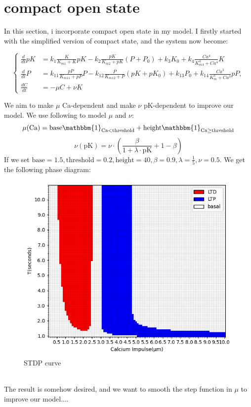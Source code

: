 \documentclass{article}
\begin{document}
\section{compact open state}
In this section, i incorporate compact open state in my model. I firstly started with the simplified version of compact state, and the system now become:

\begin{equation}
\left\{
    \begin{aligned}
        \frac{d}{dt}pK &= k_1 \frac{K}{K_{m1} + K}pK - k_2 \frac{pK}{K_{m2} + pK}(P + P_0) + k_3K_0 + k_4 \frac{Ca^4}{K_{m4}^4 + Ca^4} K\\
        \frac{d}{dt}P &= k_{11} \frac{pP}{K_{m11} + pP}P - k_{12} \frac{P}{K_{m12} + P}(pK + pK_0) + k_{13}P_0 + k_{14} \frac{Ca^3}{K_{m}^3 + Ca^3}pP,\\
        \frac{dC}{dt} &=-\mu C+\nu K
    \end{aligned}
\right.
\end{equation}

We aim to make $\mu$ Ca-dependent and make $\nu$ pK-dependent to improve our model. We use following to model $\mu$ and $\nu$:
\[
\mu(\text{Ca})=\text{base} \mathbbm{1}_{\text{Ca}<\text{threshold}}+\text{height}\mathbbm{1}_{\text{Ca}\geq\text{threshold}}
\]
\[
\nu(\text{{pK}}) = \nu \cdot\left( \frac{\beta}{1 + \lambda \cdot \text{{pK}}}  + 1 - \beta\right)
\]
If we set \(\text{base}=1.5, \text{threshold}=0.2, \text{height}=40, \beta=0.9, \lambda=\frac{1}{5},\nu=0.5\). We get the following phase diagram:
\begin{figure}[ht]
    \centering
    \includegraphics[width=.75\linewidth]{[1.5,0.2,40].png}
    \caption{STDP curve}
    \label{fig:fig4}
\end{figure}\\
The result is somehow desired, and we want to smooth the step function in $\mu$ to improve our model....
\end{document}
